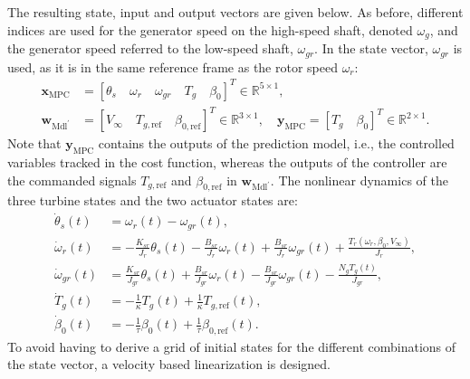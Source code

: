 %
The resulting state, input and output vectors are given below. As before, different indices are used for the generator speed on the high-speed shaft, denoted $\omega_g$, and the generator speed referred to the low-speed shaft, $\omega_{gr}$. In the state vector, $\omega_{gr}$ is used, as it is in the same reference frame as the rotor speed $\omega_r$:
\begin{equation}\label{eq:xMPCyMPC}
    \begin{aligned}
        \bm{x}_{\text{MPC}} &= [\theta_{s} \quad \omega_r \quad \omega_{gr} \quad T_g \quad \beta_0]^T \in \mathbb{R}^{5 \times 1},\\
        \bm{w}_{\text{Mdl}^\prime} &= [V_{\infty} \quad T_{g,\text{ref}} \quad \beta_{0,\text{ref}}]^T \in \mathbb{R}^{3 \times 1}, \quad
        \bm{y}_{\text{MPC}} = [T_g \quad \beta_0]^T \in \mathbb{R}^{2 \times 1}.
    \end{aligned}
\end{equation}
%
Note that $\bm{y}_{\text{MPC}}$ contains the outputs of the prediction model, i.e., the controlled variables tracked in the cost function, whereas the outputs of the controller are the commanded signals $T_{g,\text{ref}}$ and $\beta_{0,\text{ref}}$ in $\bm{w}_{\text{Mdl}^\prime}$. The nonlinear dynamics of the three turbine states and the two actuator states are:
\begin{align}
    \dot{\theta}_s(t) &= \omega_r(t)-\omega_{gr}(t) \label{eq:NLDyn1},\\
    \dot{\omega}_r(t) &= -\frac{K_{sr}}{J_r}\theta_s(t)-\frac{B_{sr}}{J_r}\omega_r(t)+\frac{B_{sr}}{J_r}\omega_{gr}(t)+\frac{T_r(\omega_r, \beta_0, V_\infty)}{J_r},\\
    \dot{\omega}_{gr}(t) &= \frac{K_{sr}}{J_{gr}}\theta_s(t)+\frac{B_{sr}}{J_{gr}}\omega_r(t)-\frac{B_{sr}}{J_{gr}}\omega_{gr}(t)-\frac{N_g T_g(t)}{J_{gr}} \label{eq:NLDyn3},\\
    \dot{T}_{g}(t) &= -\frac{1}{\kappa}T_{g}(t)+\frac{1}{\kappa}T_{g,\text{ref}}(t),\\
    \dot{\beta}_0(t) &= -\frac{1}{\tau}\beta_0(t)+\frac{1}{\tau}\beta_{0,\text{ref}}(t).\label{eq:NLDyn5}
\end{align}
%
To avoid having to derive a grid of initial states for the different combinations of the state vector, a velocity based linearization is designed.

